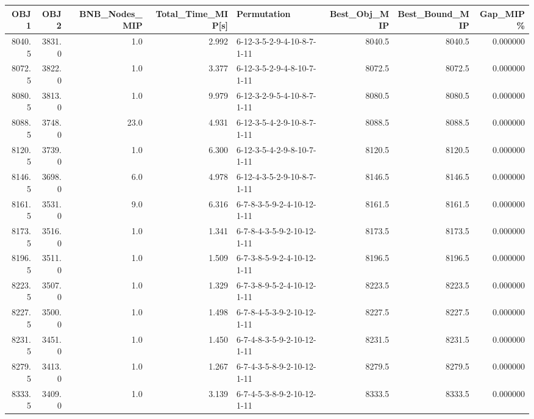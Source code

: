 \begin{tabular}{rrrrlrrr}
\toprule
    OBJ1 &    OBJ2 &  BNB\_Nodes\_MIP &  Total\_Time\_MIP[s] &                 Permutation &  Best\_Obj\_MIP &  Best\_Bound\_MIP &  Gap\_MIP\% \\
\midrule
  8040.5 &  3831.0 &            1.0 &              2.992 &  6-12-3-5-2-9-4-10-8-7-1-11 &        8040.5 &          8040.5 &  0.000000 \\
  8072.5 &  3822.0 &            1.0 &              3.377 &  6-12-3-5-2-9-4-8-10-7-1-11 &        8072.5 &          8072.5 &  0.000000 \\
  8080.5 &  3813.0 &            1.0 &              9.979 &  6-12-3-2-9-5-4-10-8-7-1-11 &        8080.5 &          8080.5 &  0.000000 \\
  8088.5 &  3748.0 &           23.0 &              4.931 &  6-12-3-5-4-2-9-10-8-7-1-11 &        8088.5 &          8088.5 &  0.000000 \\
  8120.5 &  3739.0 &            1.0 &              6.300 &  6-12-3-5-4-2-9-8-10-7-1-11 &        8120.5 &          8120.5 &  0.000000 \\
  8146.5 &  3698.0 &            6.0 &              4.978 &  6-12-4-3-5-2-9-10-8-7-1-11 &        8146.5 &          8146.5 &  0.000000 \\
  8161.5 &  3531.0 &            9.0 &              6.316 &  6-7-8-3-5-9-2-4-10-12-1-11 &        8161.5 &          8161.5 &  0.000000 \\
  8173.5 &  3516.0 &            1.0 &              1.341 &  6-7-8-4-3-5-9-2-10-12-1-11 &        8173.5 &          8173.5 &  0.000000 \\
  8196.5 &  3511.0 &            1.0 &              1.509 &  6-7-3-8-5-9-2-4-10-12-1-11 &        8196.5 &          8196.5 &  0.000000 \\
  8223.5 &  3507.0 &            1.0 &              1.329 &  6-7-3-8-9-5-2-4-10-12-1-11 &        8223.5 &          8223.5 &  0.000000 \\
  8227.5 &  3500.0 &            1.0 &              1.498 &  6-7-8-4-5-3-9-2-10-12-1-11 &        8227.5 &          8227.5 &  0.000000 \\
  8231.5 &  3451.0 &            1.0 &              1.450 &  6-7-4-8-3-5-9-2-10-12-1-11 &        8231.5 &          8231.5 &  0.000000 \\
  8279.5 &  3413.0 &            1.0 &              1.267 &  6-7-4-3-5-8-9-2-10-12-1-11 &        8279.5 &          8279.5 &  0.000000 \\
  8333.5 &  3409.0 &            1.0 &              3.139 &  6-7-4-5-3-8-9-2-10-12-1-11 &        8333.5 &          8333.5 &  0.000000 \\

\end{tabular}
